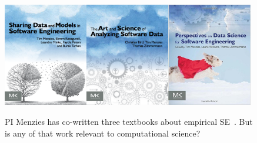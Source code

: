 \documentclass{NSF}
\begin{document}
\begin{nsfdescription}
\begin{figure}
\includegraphics[width=1.45in]{fig/book1.png}\includegraphics[width=1.45in]{fig/book2.png}\includegraphics[width=1.45in]{fig/book3.jpg}
\caption{PI Menzies has co-written    three textbooks about 
empirical SE~\cite{menzies2014sharing,bird2015art,menzies2016perspectives}. But is any of that work relevant to
 computational science?}\label{fig:books}
\end{figure}


\end{nsfdescription}
\end{document}
